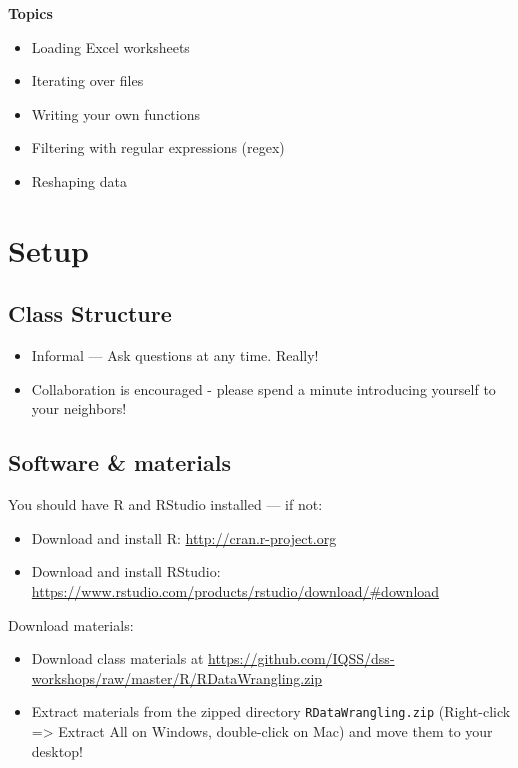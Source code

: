 \documentclass[]{book}
\providecommand{\tightlist}{%
  \setlength{\itemsep}{0pt}\setlength{\parskip}{0pt}}
\begin{document}
\textbf{Topics}

\begin{itemize}
\tightlist
\item
  Loading Excel worksheets
\item
  Iterating over files
\item
  Writing your own functions
\item
  Filtering with regular expressions (regex)
\item
  Reshaping data
\end{itemize}

\hypertarget{setup-3}{%
\section{Setup}\label{setup-3}}

\hypertarget{class-structure-3}{%
\subsection{Class Structure}\label{class-structure-3}}

\begin{itemize}
\tightlist
\item
  Informal --- Ask questions at any time. Really!
\item
  Collaboration is encouraged - please spend a minute introducing yourself to your neighbors!
\end{itemize}

\hypertarget{software-materials-3}{%
\subsection{Software \& materials}\label{software-materials-3}}

You should have R and RStudio installed --- if not:

\begin{itemize}
\tightlist
\item
  Download and install R: \url{http://cran.r-project.org}
\item
  Download and install RStudio: \url{https://www.rstudio.com/products/rstudio/download/\#download}
\end{itemize}

Download materials:

\begin{itemize}
\tightlist
\item
  Download class materials at \url{https://github.com/IQSS/dss-workshops/raw/master/R/RDataWrangling.zip}
\item
  Extract materials from the zipped directory \texttt{RDataWrangling.zip} (Right-click =\textgreater{} Extract All on Windows, double-click on Mac) and move them to your desktop!
\end{itemize}
\end{document}
